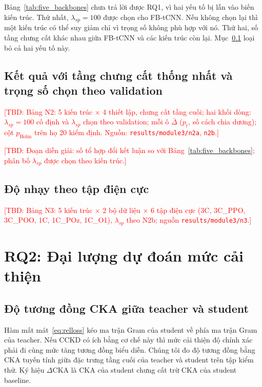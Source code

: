 \documentclass[10pt]{article} %
\newcommand{\tbd}[1]{\textcolor{red}{[TBD: #1]}}
\begin{document}
Bảng~\ref{tab:five_backbones} chưa trả lời được RQ1, vì hai yếu tố bị lẫn vào biến kiến trúc. Thứ nhất, $\lambda_{sp}=100$ được chọn cho FB-tCNN. Nếu không chọn lại thì một kiến trúc có thể suy giảm chỉ vì trọng số không phù hợp với nó. Thứ hai, số tầng chưng cất khác nhau giữa FB-tCNN và các kiến trúc còn lại. Mục~\ref{sec:rq1_matched} loại bỏ cả hai yếu tố này.

\subsection{Kết quả với tầng chưng cất thống nhất và trọng số chọn theo validation}
\label{sec:rq1_matched}

\tbd{Bảng N2: 5 kiến trúc $\times$ 4 thiết lập, chưng cất tầng cuối; hai khối dòng: $\lambda_{sp}=100$ cố định và $\lambda_{sp}$ chọn theo validation; mỗi ô $\bar\Delta$ ($p_t$, số cách chia dương); cột $p_{\text{Holm}}$ trên họ 20 kiểm định. Nguồn: \texttt{results/module3/n2a}, \texttt{n2b}.}

\tbd{Đoạn diễn giải: số tổ hợp đổi kết luận so với Bảng~\ref{tab:five_backbones}; phân bố $\lambda_{sp}$ được chọn theo kiến trúc.}

\subsection{Độ nhạy theo tập điện cực}
\label{sec:montage}

\tbd{Bảng N3: 5 kiến trúc $\times$ 2 bộ dữ liệu $\times$ 6 tập điện cực (3C, 3C\_PPO, 3C\_POO, 1C, 1C\_POz, 1C\_O1), $\lambda_{sp}$ theo N2b; nguồn \texttt{results/module3/n3}.}

\section{RQ2: Đại lượng dự đoán mức cải thiện}
\label{sec:rq2}

\subsection{Độ tương đồng CKA giữa teacher và student}
\label{sec:cka}

Hàm mất mát~\eqref{eq:relloss} kéo ma trận Gram của student về phía ma trận Gram của teacher. Nếu CCKD có ích bằng cơ chế này thì mức cải thiện độ chính xác phải đi cùng mức tăng tương đồng biểu diễn. Chúng tôi đo độ tương đồng bằng CKA tuyến tính \citep{kornblith2019similarity} giữa đặc trưng tầng cuối của teacher và student trên tập kiểm thử. Ký hiệu $\Delta$CKA là CKA của student chưng cất trừ CKA của student baseline.
\end{document}

